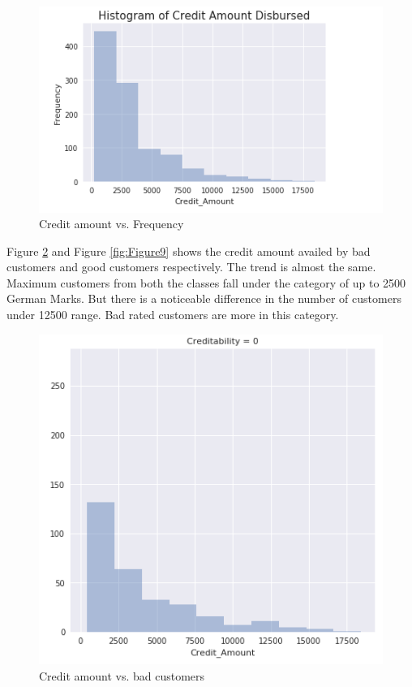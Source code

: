 \documentclass[sigconf]{acmart}
\begin{document}
\begin{figure}[htb]
  \centering
  \includegraphics[width=1.0\columnwidth]{images/Figure7.png}
  \caption{Credit amount vs. Frequency}
  \label{fig:Figure7} 
\end{figure}

Figure \ref{fig:Figure8} and Figure \ref{fig:Figure9} shows the credit amount availed by bad customers and good customers respectively. The trend is almost the same. Maximum customers from both the classes fall under the category of up to 2500 German Marks. But there is a noticeable difference in the number of customers under 12500 range. Bad rated customers are more in this category.

\begin{figure}[htb]
  \centering
  \includegraphics[width=1.0\columnwidth]{images/Figure8.png}
  \caption{Credit amount vs. bad customers}
  \label{fig:Figure8} 
\end{figure}
\end{document}
